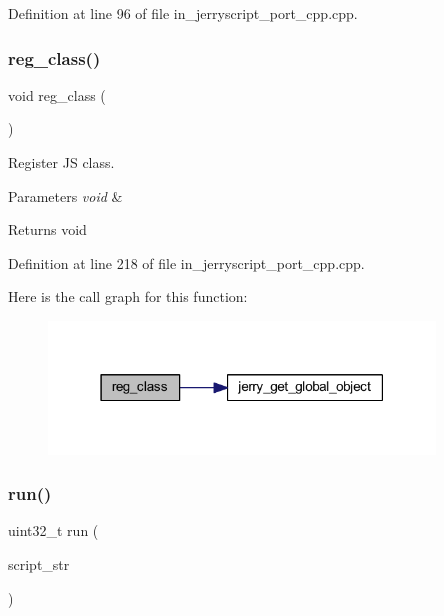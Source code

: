 Definition at line 96 of file in\+\_\+jerryscript\+\_\+port\+\_\+cpp.\+cpp.

\mbox{\label{group___port_ga27e437e9c4a6a850e656d35c61bb9bbf}} 
\subsubsection{reg\_class()}
{\footnotesize\ttfamily void reg\+\_\+class (\begin{DoxyParamCaption}\item[{void}]{ }\end{DoxyParamCaption})}



Register JS class. 


\begin{DoxyParams}{Parameters}
{\em void} & \\
\hline
\end{DoxyParams}
\begin{DoxyReturn}{Returns}
void 
\end{DoxyReturn}


Definition at line 218 of file in\+\_\+jerryscript\+\_\+port\+\_\+cpp.\+cpp.

Here is the call graph for this function\+:
\nopagebreak
\begin{figure}[H]
\begin{center}
\leavevmode
\includegraphics[width=291pt]{group___port_ga27e437e9c4a6a850e656d35c61bb9bbf_cgraph}
\end{center}
\end{figure}
\mbox{\label{group___port_gafacd49c835b8497d00c0a928232b12e2}} 
\subsubsection{run()}
{\footnotesize\ttfamily uint32\+\_\+t run (\begin{DoxyParamCaption}\item[{wx\+String}]{script\+\_\+str }\end{DoxyParamCaption})}



